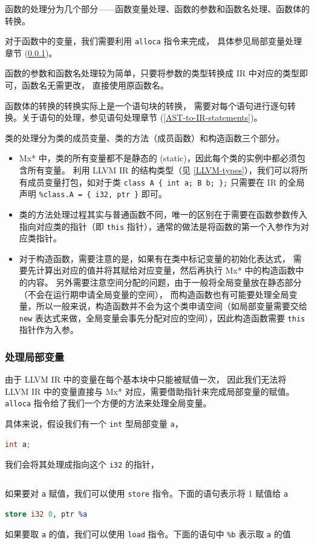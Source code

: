 函数的处理分为几个部分——函数变量处理、函数的参数和函数名处理、函数体的转换。

对于函数中的变量，我们需要利用 \texttt{alloca} 指令来完成，
具体参见局部变量处理章节 (\ref{AST-to-IR-local-variables})。

函数的参数和函数名处理较为简单，只要将参数的类型转换成 IR 中对应的类型即可，函数名无需更改，
直接使用原函数名。

函数体的转换的转换实际上是一个语句块的转换，
需要对每个语句进行逐句转换。关于语句的处理，参见语句处理章节 (\ref{AST-to-IR-statements})。

类的处理分为类的成员变量、类的方法（成员函数）和构造函数三个部分。
\begin{itemize}
  \item Mx* 中，类的所有变量都不是静态的 (static)，因此每个类的实例中都必须包含所有变量。
    利用 LLVM IR 的结构类型（见 \ref{LLVM-types}），我们可以将所有成员变量打包，如对于类
    \texttt{class A \{ int a; B b; \};} 只需要在 IR 的全局声明
    \texttt{\%class.A = \{ i32, ptr \}} 即可。
  \item 类的方法处理过程其实与普通函数不同，唯一的区别在于需要在函数参数传入指向对应类的指针（即
    \texttt{this} 指针），通常的做法是将函数的第一个入参作为对应类指针。
  \item 对于构造函数，需要注意的是，如果有在类中标记变量的初始化表达式，
    需要先计算出对应的值并将其赋给对应变量，然后再执行 Mx* 中的构造函数中的内容。
    另外需要注意空间分配的问题，由于一般将全局变量放在静态部分（不会在运行期申请全局变量的空间），
    而构造函数也有可能要处理全局变量，所以一般来说，构造函数并不会为这个类申请空间（如局部变量需要交给
    \texttt{new} 表达式来做，全局变量会事先分配对应的空间），因此构造函数需要
    \texttt{this} 指针作为入参。
\end{itemize}

\subsubsection{处理局部变量}\label{AST-to-IR-local-variables}

由于 LLVM IR 中的变量在每个基本块中只能被赋值一次，
因此我们无法将 LLVM IR 中的变量直接与 Mx* 对应，需要借助指针来完成局部变量的赋值。
\texttt{alloca} 指令给了我们一个方便的方法来处理全局变量。

具体来说，假设我们有一个 \texttt{int} 型局部变量 \texttt{a}，
\begin{lstlisting}[language=C++]
int a;
\end{lstlisting}
我们会将其处理成指向这个 \texttt{i32} 的指针，
\begin{lstlisting}[language=LLVM]
%a = alloca i32
\end{lstlisting}
如果要对 \texttt{a} 赋值，我们可以使用 \texttt{store} 指令。下面的语句表示将 1 赋值给 \texttt{a}
\begin{lstlisting}[language=LLVM]
store i32 0, ptr %a
\end{lstlisting}
如果要取 \texttt{a} 的值，我们可以使用 \texttt{load} 指令。下面的语句中 \texttt{\%b}
表示取 \texttt{a} 的值
\begin{lstlisting}[language=LLVM]
%b = load i32, ptr %5
\end{lstlisting}

